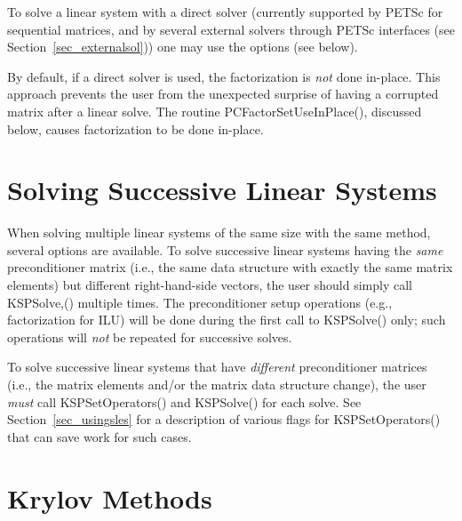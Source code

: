 To solve a linear system with a direct solver (currently supported
by PETSc for sequential matrices, and by several external solvers through
PETSc interfaces (see Section~\ref{sec_externalsol})) one may use the options
   
(see below).

By default, if a direct solver is used, the factorization is {\em not} done
in-place. This approach prevents the user from the unexpected surprise
of having a corrupted matrix after a linear solve. The routine
PCFactorSetUseInPlace(), discussed below, causes factorization to
be done in-place.

\section{Solving Successive Linear Systems}

When solving multiple linear systems of the same size with the same
method, several options are available.  To solve successive linear
systems having the {\em same} preconditioner matrix (i.e., the same
data structure with exactly the same matrix elements) but different
right-hand-side vectors, the user should simply call KSPSolve,()
multiple times.  The preconditioner setup operations (e.g.,
factorization for ILU) will be done during the first call to KSPSolve() only; such operations will {\em not} be repeated for
successive solves.

To solve successive linear systems that have {\em different}
preconditioner matrices (i.e., the matrix elements and/or the matrix
data structure change), the user {\em must} call
KSPSetOperators() and KSPSolve() for each solve.  See
Section~\ref{sec_usingsles} for a description of various flags for
KSPSetOperators() that can save work for such cases.

\section{Krylov Methods}
\label{sec_ksp}

